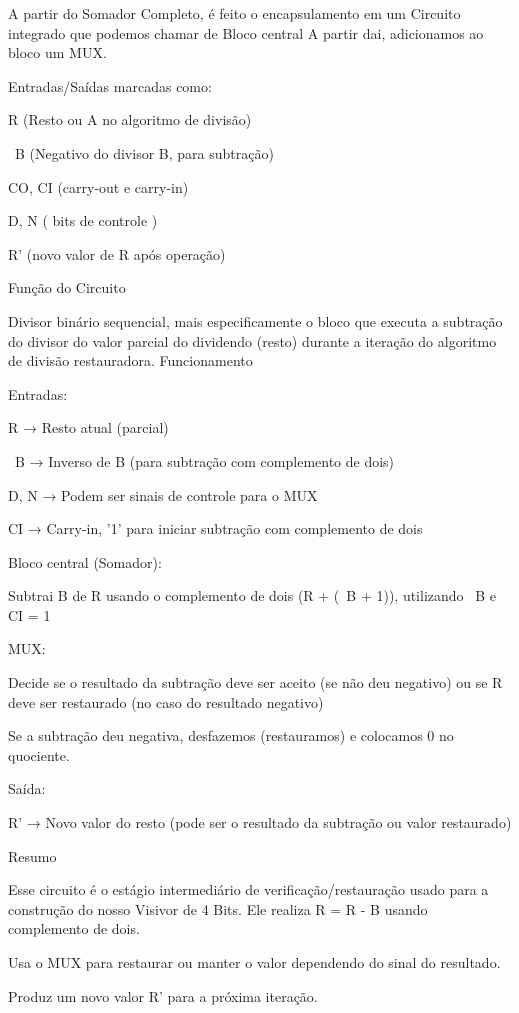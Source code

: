 \documentclass[
12pt,
openright,
oneside,
a4paper,
chapter=TITLE,
english,
brazil,
colorlinks=true,
linkcolor=blue,
citecolor=blue,
filecolor=magenta,
urlcolor=blue
]{abntex2}
\begin{document}
    A partir do Somador Completo, é feito o encapsulamento em um Circuito integrado que podemos chamar de Bloco central  A partir dai, adicionamos ao bloco um MUX.

 
    Entradas/Saídas marcadas como:

        R (Resto ou A no algoritmo de divisão)

        ~B (Negativo do divisor B,  para subtração)

        CO, CI (carry-out e carry-in)

        D, N ( bits de controle )

        R' (novo valor de R após operação)

 
 Função do Circuito

    Divisor binário sequencial, mais especificamente o bloco que executa a subtração do divisor do valor parcial do dividendo (resto) durante a iteração do algoritmo de divisão restauradora.
 Funcionamento  

    Entradas:

        R → Resto atual (parcial)

        ~B → Inverso de B (para subtração com complemento de dois)

        D, N → Podem ser sinais de controle para o MUX

        CI → Carry-in,   '1' para iniciar subtração com complemento de dois

    Bloco central (Somador):

        Subtrai B de R usando o complemento de dois (R + (~B + 1)), utilizando ~B e CI = 1

    MUX:

        Decide se o resultado da subtração deve ser aceito (se não deu negativo) ou se R deve ser restaurado (no caso do resultado negativo)

        Se a subtração deu negativa, desfazemos (restauramos) e colocamos 0 no quociente.

    Saída:

        R' → Novo valor do resto (pode ser o resultado da subtração ou valor restaurado)

 Resumo

Esse circuito é o estágio intermediário de verificação/restauração usado para a construção do nosso Visivor de 4 Bits.
    Ele realiza R = R - B usando complemento de dois.

    Usa o MUX para restaurar ou manter o valor dependendo do sinal do resultado.

    Produz um novo valor R' para a próxima iteração.
\end{document}
